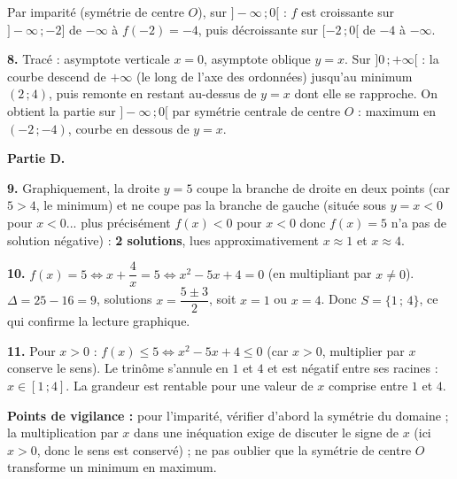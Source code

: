 \documentclass[11pt]{article}
\begin{document}
\begin{corrige}
Par imparité (symétrie de centre $O$), sur $]-\infty\,;0[$ : $f$ est croissante sur $]-\infty\,;-2]$ de $-\infty$ à $f(-2)=-4$, puis décroissante sur $[-2\,;0[$ de $-4$ à $-\infty$.

\textbf{8.} Tracé : asymptote verticale $x=0$, asymptote oblique $y=x$. Sur $]0\,;+\infty[$ : la courbe descend de $+\infty$ (le long de l'axe des ordonnées) jusqu'au minimum $(2\,;4)$, puis remonte en restant au-dessus de $y=x$ dont elle se rapproche. On obtient la partie sur $]-\infty\,;0[$ par symétrie centrale de centre $O$ : maximum en $(-2\,;-4)$, courbe en dessous de $y=x$.

\textbf{Partie D.}

\textbf{9.} Graphiquement, la droite $y=5$ coupe la branche de droite en deux points (car $5>4$, le minimum) et ne coupe pas la branche de gauche (située sous $y=x<0$ pour $x<0$... plus précisément $f(x)<0$ pour $x<0$ donc $f(x)=5$ n'a pas de solution négative) : \textbf{2 solutions}, lues approximativement $x\approx 1$ et $x\approx 4$.

\textbf{10.} $f(x)=5\iff x+\dfrac4x=5\iff x^2-5x+4=0$ (en multipliant par $x\neq 0$). $\Delta=25-16=9$, solutions $x=\dfrac{5\pm 3}{2}$, soit $x=1$ ou $x=4$. Donc $S=\{1\,;\,4\}$, ce qui confirme la lecture graphique.

\textbf{11.} Pour $x>0$ : $f(x)\leq 5\iff x^2-5x+4\leq 0$ (car $x>0$, multiplier par $x$ conserve le sens). Le trinôme s'annule en $1$ et $4$ et est négatif entre ses racines : $x\in[1\,;4]$. La grandeur est rentable pour une valeur de $x$ comprise entre $1$ et $4$.

\textbf{Points de vigilance :} pour l'imparité, vérifier d'abord la symétrie du domaine ; la multiplication par $x$ dans une inéquation exige de discuter le signe de $x$ (ici $x>0$, donc le sens est conservé) ; ne pas oublier que la symétrie de centre $O$ transforme un minimum en maximum.
\end{corrige}
\end{document}
